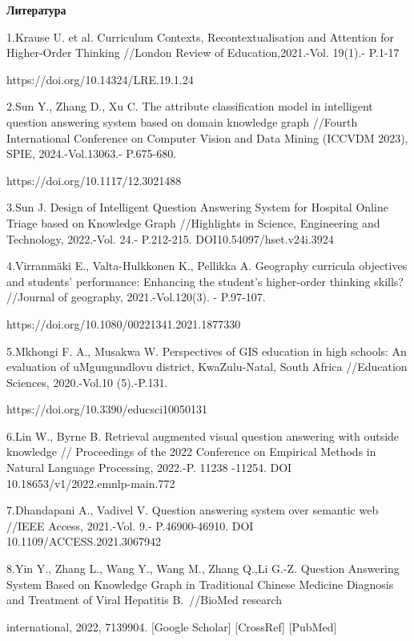 \begin{center}
{\bfseries Литература}
\end{center}

\begin{noparindent}
1.Krause U. et al. Curriculum Contexts, Recontextualisation and
Attention for Higher-Order Thinking //London Review of
Education,2021.-Vol. 19(1).- P.1-17

https://doi.org/10.14324/LRE.19.1.24

2.Sun Y., Zhang D., Xu C. The attribute classification model in
intelligent question answering system based on domain knowledge graph
//Fourth International Conference on Computer Vision and Data Mining
(ICCVDM 2023), SPIE, 2024.-Vol.13063.- P.675-680.

https://doi.org/10.1117/12.3021488

3.Sun J. Design of Intelligent Question Answering System for Hospital
Online Triage based on Knowledge Graph //Highlights in Science,
Engineering and Technology, 2022.-Vol. 24.- P.212-215.
DOI10.54097/hset.v24i.3924

4.Virranmäki E., Valta-Hulkkonen K., Pellikka A. Geography curricula
objectives and students' performance: Enhancing the student's
higher-order thinking skills? //Journal of geography, 2021.-Vol.120(3).
- P.97-107.

https://doi.org/10.1080/00221341.2021.1877330

5.Mkhongi F. A., Musakwa W. Perspectives of GIS education in high
schools: An evaluation of uMgungundlovu district, KwaZulu-Natal, South
Africa //Education Sciences, 2020.-Vol.10 (5).-P.131.

https://doi.org/10.3390/educsci10050131

6.Lin W., Byrne B. Retrieval augmented visual question answering with
outside knowledge // Proceedings of the 2022 Conference on Empirical
Methods in Natural Language Processing, 2022.-P. 11238 -11254. DOI
10.18653/v1/2022.emnlp-main.772

7.Dhandapani A., Vadivel V. Question answering system over semantic web
//IEEE Access, 2021.-Vol. 9.- P.46900-46910. DOI
10.1109/ACCESS.2021.3067942

8.Yin Y., Zhang L., Wang Y., Wang M., Zhang Q.,Li G.-Z. Question
Answering System Based on Knowledge Graph in Traditional Chinese
Medicine Diagnosis and Treatment of Viral Hepatitis B.~//BioMed research

international, 2022, 7139904. {[}Google Scholar{]} {[}CrossRef{]}
{[}PubMed{]}


\end{noparindent}
